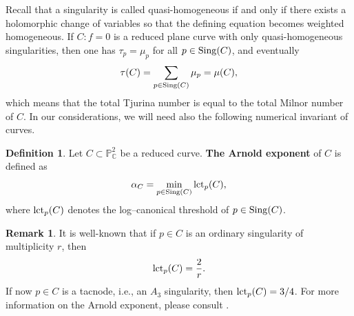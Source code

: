 \documentclass[11pt]{article}
\theoremstyle{plain}
\theoremstyle{definition}
\newtheorem{definition}[thm]{Definition}
\newtheorem{remark}[thm]{Remark}
\begin{document}
Recall that a singularity is called quasi-homogeneous if and only if there exists a holomorphic change of variables so that the defining equation becomes weighted homogeneous. If $C : f=0$ is a reduced plane curve with only quasi-homogeneous singularities, then one has $\tau_{p}=\mu_{p}$ for all $p \in {\rm Sing}(C)$, and eventually 
$$\tau(C) = \sum_{p \in {\rm Sing}(C)} \mu_{p} = \mu(C),$$
which means that the total Tjurina number is equal to the total Milnor number of $C$. In our considerations, we will need also the following numerical invariant of curves.
\begin{definition}
Let $C \subset \mathbb{P}^{2}_{\mathbb{C}}$ be a reduced curve. \textbf{The Arnold exponent} of $C$ is defined as
$$\alpha_{C} =  \min_{p \in {\rm Sing}(C)} {\rm lct}_{p}(C),$$
where  ${\rm lct}_{p}(C)$ denotes the log--canonical threshold of $p \in {\rm Sing}(C)$.
\end{definition}
\begin{remark}
It is well-known that if $p \in C$ is an ordinary singularity of multiplicity $r$, then $${\rm lct}_{p}(C) = \frac{2}{r}.$$
If now $p \in C$ is a tacnode, i.e., an $A_{3}$ singularity, then ${\rm lct}_{p}(C) = 3/4$. For more information on the Arnold exponent, please consult \cite{DimSer}.
\end{remark}
\end{document}
